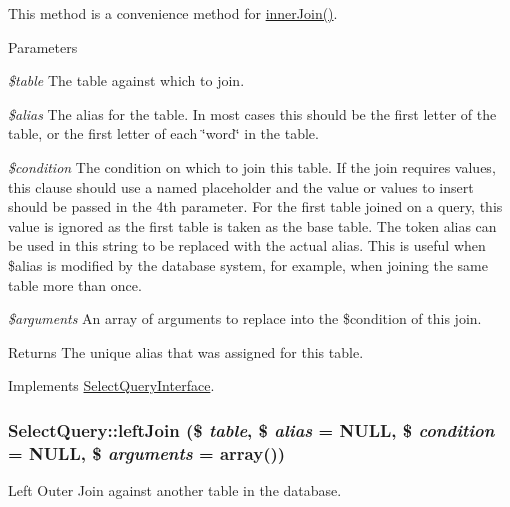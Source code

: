 This method is a convenience method for \hyperlink{classSelectQuery_a2e3bad44c2eca1e74130622a93fdc394}{innerJoin()}.


\begin{DoxyParams}{Parameters}
\item[{\em \$table}]The table against which to join. \item[{\em \$alias}]The alias for the table. In most cases this should be the first letter of the table, or the first letter of each \char`\"{}word\char`\"{} in the table. \item[{\em \$condition}]The condition on which to join this table. If the join requires values, this clause should use a named placeholder and the value or values to insert should be passed in the 4th parameter. For the first table joined on a query, this value is ignored as the first table is taken as the base table. The token alias can be used in this string to be replaced with the actual alias. This is useful when \$alias is modified by the database system, for example, when joining the same table more than once. \item[{\em \$arguments}]An array of arguments to replace into the \$condition of this join. \end{DoxyParams}
\begin{DoxyReturn}{Returns}
The unique alias that was assigned for this table. 
\end{DoxyReturn}


Implements \hyperlink{interfaceSelectQueryInterface_a596614bc76873c1487f87d30f892a651}{SelectQueryInterface}.\hypertarget{classSelectQuery_ab542a3bf62cfab85c8a4e0c3ac093d11}{
\subsubsection[{leftJoin}]{\setlength{\rightskip}{0pt plus 5cm}SelectQuery::leftJoin (\$ {\em table}, \/  \$ {\em alias} = {\ttfamily NULL}, \/  \$ {\em condition} = {\ttfamily NULL}, \/  \$ {\em arguments} = {\ttfamily array()})}}
\label{classSelectQuery_ab542a3bf62cfab85c8a4e0c3ac093d11}
Left Outer Join against another table in the database.


